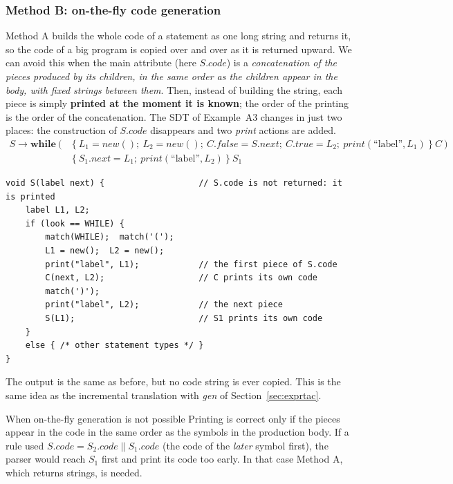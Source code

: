 \documentclass[11pt,a4paper]{article}
\newcommand{\cc}{\mathbin{\|}}
\newcommand{\at}[2]{\ensuremath{#1.\mathit{#2}}}
\newcommand{\tok}[1]{\ensuremath{\mathtt{#1}}}
\begin{document}
\subsubsection{Method B: on-the-fly code generation}
Method A builds the whole code of a statement as one long string and returns it, so the code of a big program is copied over and over as it is returned upward. We can avoid this when the main attribute (here $S.code$) is a \emph{concatenation of the pieces produced by its children, in the same order as the children appear in the body, with fixed strings between them}. Then, instead of building the string, each piece is simply \textbf{printed at the moment it is known}; the order of the printing is the order of the concatenation. The SDT of Example~A3 changes in just two places: the construction of $S.code$ disappears and two \textit{print} actions are added.
\begin{align*}
S \to \mathbf{while}\ \tok{(}\ &\{\ L_1=\mathit{new}();\ L_2=\mathit{new}();\ \at{C}{false}=\at{S}{next};\ \at{C}{true}=L_2;\ \mathit{print}(\text{``label''},L_1)\ \}\ C\ \tok{)}\\
&\{\ \at{S_1}{next}=L_1;\ \mathit{print}(\text{``label''},L_2)\ \}\ S_1
\end{align*}
\begin{lstlisting}
void S(label next) {                   // S.code is not returned: it is printed
    label L1, L2;
    if (look == WHILE) {
        match(WHILE);  match('(');
        L1 = new();  L2 = new();
        print("label", L1);            // the first piece of S.code
        C(next, L2);                   // C prints its own code
        match(')');
        print("label", L2);            // the next piece
        S(L1);                         // S1 prints its own code
    }
    else { /* other statement types */ }
}
\end{lstlisting}
The output is the same as before, but no code string is ever copied. This is the same idea as the incremental translation with \textit{gen} of Section~\ref{sec:exprtac}.

\begin{pitfallbox}{When on-the-fly generation is not possible}
Printing is correct only if the pieces appear in the code in the same order as the symbols in the production body. If a rule used $S.code=S_2.code\cc S_1.code$ (the code of the \emph{later} symbol first), the parser would reach $S_1$ first and print its code too early. In that case Method A, which returns strings, is needed.
\end{pitfallbox}
\end{document}
